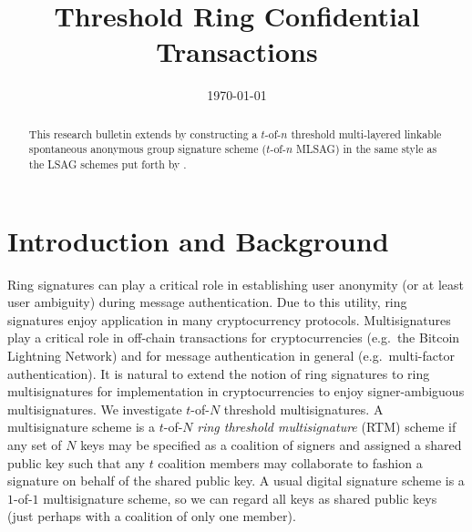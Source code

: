 \documentclass[12pt,english,oneside]{mrl}
\theoremstyle{definition}
\numberwithin{equation}{section}
\numberwithin{figure}{section}
\numberwithin{equation}{section}
\numberwithin{equation}{section}
\numberwithin{figure}{section}
\begin{document}
\begin{frontmatter}

\begin{fmbox}
\hfill\setlength{\fboxrule}{0px}\setlength{\fboxsep}{5px}
\title{Threshold Ring Confidential Transactions}
\date{\today}
\author[
   addressref={mrl},
   email={bggoode@g.clemson.edu}
]{ }
\author[
   addressref={mrl},
   email={sarang.noether@protonmail.com}
]{ }


\address[id=mrl]{
}
\end{fmbox}

\begin{abstractbox}
\begin{abstract}
This research bulletin extends \cite{noether2016ring} by constructing a $t$-of-$n$ threshold multi-layered linkable spontaneous anonymous group signature scheme ($t$-of-$n$ MLSAG) in the same style as the LSAG schemes put forth by \cite{liu2004linkable}. %
\end{abstract}
\end{abstractbox}
\end{frontmatter}


\section{Introduction and Background}

Ring signatures can play a critical role in establishing user anonymity (or at least user ambiguity) during message authentication. Due to this utility, ring signatures enjoy application in many cryptocurrency protocols. Multisignatures play a critical role in off-chain transactions for cryptocurrencies (e.g.\ the Bitcoin Lightning Network) and for message authentication in general (e.g.\ multi-factor authentication). It is natural to extend the notion of ring signatures to ring multisignatures for implementation in cryptocurrencies to enjoy signer-ambiguous multisignatures. We investigate $t$-of-$N$ threshold multisignatures. A multisignature scheme is a $t$-of-$N$ \textit{ring threshold multisignature} (RTM) scheme if any set of $N$ keys may be specified as a coalition of signers and assigned a shared public key such that any $t$ coalition members may collaborate to fashion a signature on behalf of the shared public key. A usual digital signature scheme is a $1$-of-$1$ multisignature scheme, so we can regard all keys as shared public keys (just perhaps with a coalition of only one member).
\end{document}
